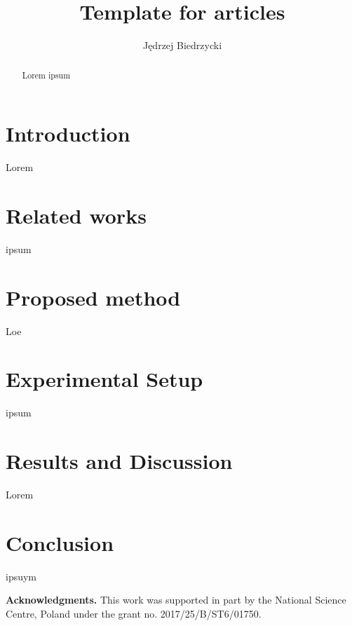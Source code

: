 \documentclass{article}
\begin{document}
    \title{Template for articles}
    \author{Jędrzej Biedrzycki}%

    \maketitle

    \begin{abstract}
        Lorem ipsum
    \end{abstract}

    \section{Introduction}
    Lorem
    \section{Related works}
    ipsum
    \section{Proposed method}
    Loe

    \section{Experimental Setup}
    ipsum
    \section{Results and Discussion}
    Lorem
    \section{Conclusion}
    ipsuym

    \textbf{Acknowledgments.} This work was supported in part by the National Science Centre, Poland under the grant no. 2017/25/B/ST6/01750.

%    
%    
\end{document}
